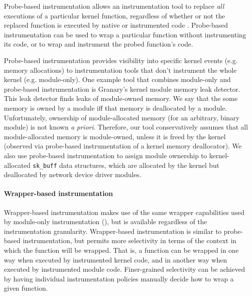 \documentclass[preprint]{sigplanconf}
\begin{document}
Probe-based instrumentation allows an instrumentation tool to replace \emph{all} executions of a particular kernel function, regardless of whether or not the replaced function is executed by native or instrumented code \cite{KProbes, AnyWhereAnyTimeDBT, KernInst}. Probe-based instrumentation can be used to wrap a particular function without instrumenting its code, or to wrap and instrument the probed function's code.

Probe-based instrumentation provides visibility into specific kernel events (e.g. memory allocations) to instrumentation tools that don't instrument the whole kernel (e.g. module-only). One example tool that combines module-only and probe-based instrumentation is Granary's kernel module memory leak detector. This leak detector finds leaks of module-owned memory. We say that the some memory is owned by a module iff that memory is deallocated by a module. Unfortunately, ownership of module-allocated memory (for an arbitrary, binary module) is not known \emph{a priori}. Therefore, our tool conservatively assumes that all module-allocated memory is module-owned, unless it is freed by the kernel (observed via probe-based instrumentation of a kernel memory deallocator). We also use probe-based instrumentation to assign module ownership to kernel-allocated \texttt{sk\_buff} data structures, which are allocated by the kernel but deallocated by network device driver modules.

\paragraph{Wrapper-based instrumentation}

Wrapper-based instrumentation makes use of the same wrapper capabilities used by module-only instrumentation (), but is available regardless of the instrumentation granularity. Wrapper-based instrumentation is similar to probe-based instrumentation, but permits more selectivity in terms of the context in which the function will be wrapped. That is, a function can be wrapped in one way when executed by instrumented kernel code, and in another way when executed by instrumented module code. Finer-grained selectivity can be achieved by having individual instrumentation policies manually decide how to wrap a given function.
\end{document}
